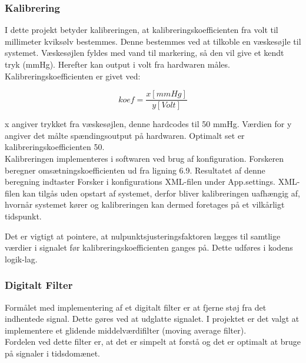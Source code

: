 \subsubsection{Kalibrering}
I dette projekt betyder kalibreringen, at kalibreringskoefficienten fra volt til millimeter kviksølv bestemmes. Denne bestemmes ved at tilkoble en væskesøjle til systemet. Væskesøjlen fyldes med vand til markering, så den vil give et kendt tryk (mmHg). Herefter kan output i volt fra hardwaren måles. Kalibreringskoefficienten er givet ved:
\begin{ceqn}
\begin{equation}
koef=\dfrac{x [mmHg]}{y [Volt]}
\end{equation}
\end{ceqn}
x angiver trykket fra væskesøjlen, denne hardcodes til 50 mmHg. Værdien for y angiver det målte spændingsoutput på hardwaren. Optimalt set er kalibreringskoefficienten 50.\\ 
Kalibreringen implementeres i softwaren ved brug af konfiguration. Forskeren beregner omsætningskoefficienten ud fra ligning 6.9. Resultatet af denne beregning indtaster Forsker i konfigurations XML-filen under App.settings. XML-filen kan tilgås uden opstart af systemet, derfor bliver kalibreringen uafhængig af, hvornår systemet kører og kalibreringen kan dermed foretages på et vilkårligt tidspunkt.

Det er vigtigt at pointere, at nulpunktsjusteringsfaktoren lægges til samtlige værdier i signalet før kalibreringskoefficienten ganges på. Dette udføres i kodens logik-lag.

\subsubsection{Digitalt Filter}
Formålet med implementering af et digitalt filter\cite{DSBsoft} er at fjerne støj fra det indhentede signal. Dette gøres ved at udglatte signalet. I projektet er det valgt at implementere et glidende middelværdifilter (moving average filter).\\ Fordelen ved dette filter er, at det er simpelt at forstå og det er optimalt at bruge på signaler i tidsdomænet.

